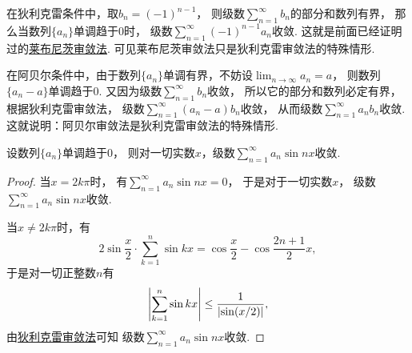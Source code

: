 \begin{remark}
在狄利克雷条件中，取\(b_n = (-1)^{n-1}\)，
则级数\(\sum_{n=1}^\infty b_n\)的部分和数列有界，
那么当数列\(\{a_n\}\)单调趋于\(0\)时，
级数\(\sum_{n=1}^\infty (-1)^{n-1} a_n\)收敛.
这就是前面已经证明过的\hyperref[theorem:无穷级数.莱布尼茨定理]{莱布尼茨审敛法}.
可见莱布尼茨审敛法只是狄利克雷审敛法的特殊情形.

在阿贝尔条件中，由于数列\(\{a_n\}\)单调有界，不妨设\(\lim_{n\to\infty} a_n = a\)，
则数列\(\{a_n - a\}\)单调趋于\(0\).
又因为级数\(\sum_{n=1}^\infty b_n\)收敛，
所以它的部分和数列必定有界，根据狄利克雷审敛法，
级数\(\sum_{n=1}^\infty (a_n - a) b_n\)收敛，
从而级数\(\sum_{n=1}^\infty a_n b_n\)收敛.
这就说明：阿贝尔审敛法是狄利克雷审敛法的特殊情形.
\end{remark}

\begin{example}\label{example:无穷级数.单调收敛数列与正弦函数列的乘积的级数收敛}
设数列\(\{a_n\}\)单调趋于\(0\)，
则对一切实数\(x\)，级数\(\sum_{n=1}^\infty a_n \sin n x\)收敛.
\begin{proof}
当\(x=2k\pi\)时，
有\(\sum_{n=1}^\infty a_n \sin n x = 0\)，
于是对于一切实数\(x\)，
级数\(\sum_{n=1}^\infty a_n \sin n x\)收敛.

当\(x\neq2k\pi\)时，有\begin{equation*}
	2\sin\frac{x}{2} \cdot \sum_{k=1}^n \sin kx
	= \cos\frac{x}{2} - \cos\frac{2n+1}{2}x,
\end{equation*}
于是对一切正整数\(n\)有\begin{equation*}
	\abs{\sum_{k=1}^n \sin k x}
	\leq \frac1{\abs{\sin(x/2)}},
\end{equation*}
由\hyperref[theorem:无穷级数.无穷级数的阿贝尔--狄利克雷审敛法]{狄利克雷审敛法}可知
级数\(\sum_{n=1}^\infty a_n \sin n x\)收敛.
\end{proof}
\end{example}
